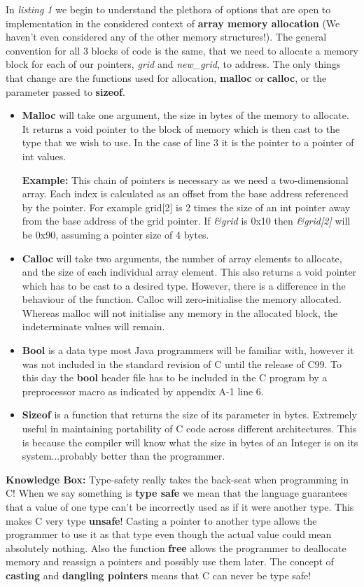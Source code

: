 \documentclass[11pt]{article} %
\begin{document}
In {\it listing 1} we begin to understand the plethora of options that are open to implementation in the considered context of {\bf array memory allocation} (We haven't even considered any of the other memory structures!). The general convention for all 3 blocks of code is the same, that we need to allocate a memory block for each of our pointers, {\it grid} and {\it new\_grid}, to address. The only things that change are the functions used for allocation, {\bf malloc} or {\bf calloc}, or the parameter passed to {\bf sizeof}.
\begin{itemize}
\item {\bf Malloc} will take one argument, the size in bytes of the memory to allocate. It returns a void pointer to the block of memory which is then cast to the type that we wish to use. In the case of line 3 it is the pointer to a pointer of int values. 
\begin{mdframed}
{\bf Example: }This chain of pointers is necessary as we need a two-dimensional array. Each index is calculated as an offset from the base address referenced by the pointer. For example grid[2] is 2 times the size of an int pointer away from the base address of the grid pointer. If {\it \&grid} is 0x10 then {\it \&grid[2]} will be 0x90, assuming a pointer size of 4 bytes.
\end{mdframed}
\item {\bf Calloc} will take two arguments, the number of array elements to allocate, and the size of each individual array element. This also returns a void pointer which has to be cast to a desired type. However, there is a difference in the behaviour of the function. Calloc will zero-initialise the memory allocated. Whereas malloc will not initialise any memory in the allocated block, the indeterminate values will remain. 
\item {\bf Bool} is a data type most Java programmers will be familiar with, however it was not included in the standard revision of C until the release of C99. To this day the {\bf bool} header file has to be included in the C program by a preprocessor macro as indicated by appendix A-1 line 6. 
\item {\bf Sizeof} is a function that returns the size of its parameter in bytes. Extremely useful in maintaining portability of C code across different architectures. This is because the compiler will know what the size in bytes of an Integer is on its system...probably better than the programmer.
\end{itemize}
\begin{mdframed}
{\bf Knowledge Box:} Type-safety really takes the back-seat when programming in C! When we say something is {\bf type safe} we mean that the language guarantees that a value of one type can't be incorrectly used as if it were another type. This makes C very type {\bf unsafe}! Casting a pointer to another type allows the programmer to use it as that type even though the actual value could mean absolutely nothing. Also the function {\bf free} allows the programmer to deallocate memory and reassign a pointers and possibly use them later. The concept of {\bf casting} and {\bf dangling pointers} means that C can never be type safe! \cite[Type Safety]{ref11}
\end{mdframed}
\end{document}

